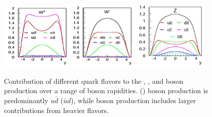 \begin{figure}[htbp]
\centering
\includegraphics[width=0.31\textwidth]{plots/SM/rapidity_Wp.JPG}
\includegraphics[width=0.30\textwidth]{plots/SM/rapidity_Wm.JPG}
\includegraphics[width=0.32\textwidth]{plots/SM/rapidity_Z.JPG}
\caption{Contribution of different quark flavors to the \Wp, \Wm, and \Z boson production over a range of boson rapidities. \Wp (\Wm) boson production is predominantly $u\bar{d}$ ($\bar{u}d$), while \Z boson production includes larger contributions from heavier flavors.}
\label{fig:wz_rapidity}
\end{figure}